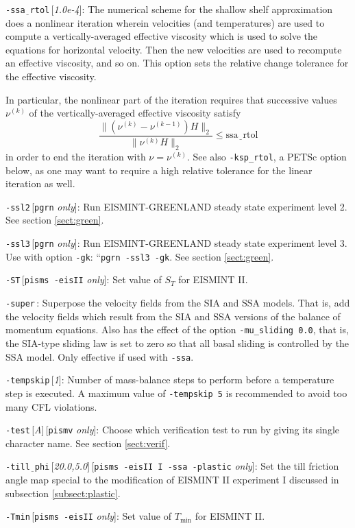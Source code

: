 \documentclass[11pt,final]{amsart}
\newcommand{\rawopt}[1]{\vspace{1mm}\noindent \large\texttt{-#1}\normalsize}
\newcommand{\opt}[1]{\rawopt{#1}\,:\quad}
\newcommand{\optdef}[2]{\rawopt{#1}\,[\textsl{#2}]:\quad}
\newcommand{\optrestrict}[2]{\rawopt{#1}\,[\texttt{#2} \textsl{only}]:\quad}
\newcommand{\optdefrestrict}[3]{\rawopt{#1}\,[\textsl{#2}]\,[\texttt{#3} \textsl{only}]:\quad}
\newcommand{\und}{$\underline{\,\,\,}$}
\begin{document}
\optdef{ssa\und rtol}{1.0e-4}  The numerical scheme for the shallow shelf approximation \cite{WeisGreveHutter} does a nonlinear iteration wherein velocities (and temperatures) are used to compute a vertically-averaged effective viscosity which is used to solve the equations for horizontal velocity.  Then the new velocities are used to recompute an effective viscosity, and so on.  This option sets the relative change tolerance for the effective viscosity.

In particular, the nonlinear part of the iteration requires that successive values $\nu^{(k)}$ of the vertically-averaged effective viscosity satisfy
	$$\frac{\|(\nu^{(k)} - \nu^{(k-1)}) H\|_2}{\|\nu^{(k)} H\|_2} \le \text{ssa\und rtol}$$
in order to end the iteration with $\nu = \nu^{(k)}$.  See also \verb|-ksp_rtol|, a PETSc option below, as one may want to require a high relative tolerance for the linear iteration as well.

\optrestrict{ssl2}{pgrn}    Run EISMINT-GREENLAND steady state experiment level 2. See section \ref{sect:green}.

\optrestrict{ssl3}{pgrn}    Run EISMINT-GREENLAND steady state experiment level 3.  Use with option \verb|-gk|: ``\verb|pgrn -ssl3 -gk|.  See section \ref{sect:green}.

\optrestrict{ST}{pisms -eisII}    Set value of $S_T$ for EISMINT II.

\opt{super}  Superpose the velocity fields from the SIA and SSA models.  That is, add the velocity fields which result from the SIA and SSA versions of the balance of momentum equations.  Also has the effect of the option \verb|-mu_sliding 0.0|, that is, the SIA-type sliding law is set to zero so that all basal sliding is controlled by the SSA model.  Only effective if used with \verb|-ssa|.

\optdef{tempskip}{1}  Number of mass-balance steps to perform before a temperature step is executed.  A maximum value of \verb|-tempskip 5| is recommended to avoid too many CFL violations.

\optdefrestrict{test}{A}{pismv}  Choose which verification test to run by giving its single character name.  See section \ref{sect:verif}.

\optdefrestrict{till\und phi}{20.0,5.0}{pisms -eisII I -ssa -plastic}  Set the till friction angle map special to the modification of EISMINT II experiment I discussed in subsection \ref{subsect:plastic}.

\optrestrict{Tmin}{pisms -eisII}    Set value of $T_{\text{min}}$ for EISMINT II.
\end{document}
